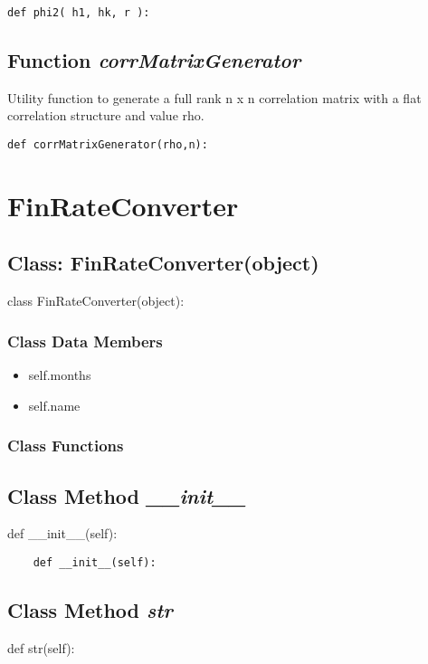 \documentclass[twoside,11pt]{book}
\begin{document}
\begin{lstlisting}
def phi2( h1, hk, r ):
\end{lstlisting}

\subsection{Function {\it corrMatrixGenerator}}
Utility function to generate a full rank n x n correlation matrix with a flat correlation structure and value rho. 

\begin{lstlisting}
def corrMatrixGenerator(rho,n):
\end{lstlisting}

\newpage
\section{FinRateConverter}

\subsection{Class: FinRateConverter(object)}
class FinRateConverter(object):

\subsubsection{Class Data Members}
\begin{itemize}
\item{self.months}
\item{self.name}
\end{itemize}

\subsubsection{Class Functions}

\subsection{Class Method {\it \_\_init\_\_}}
def \_\_init\_\_(self):

\begin{lstlisting}
    def __init__(self):
\end{lstlisting}

\subsection{Class Method {\it str}}
def str(self):
\end{document}

